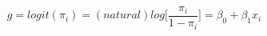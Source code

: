 \documentclass[10pt]{article}
\begin{document}
\[g = logit(\pi_i) = (natural) log\big[\frac{\pi_i}{1-\pi_i}\big] = \beta_0 + \beta_1 x_i
\]
\end{document}

